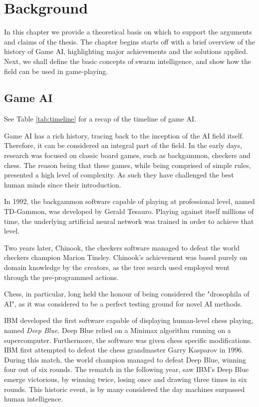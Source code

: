 \section{Background} \label{section:background}
In this chapter we provide a theoretical basis on which to support the arguments and claims of the thesis. 
The chapter begins starts off with a brief overview of the history of Game AI, 
highlighting major achievements and the solutions applied.
Next, we shall define the basic concepts of swarm intelligence, 
and show how the field can be used in game-playing.


\subsection{Game AI} \label{subsection:game_ai}
See Table \ref{tab:timeline} for a recap of the timeline of game AI.


Game AI has a rich history, tracing back to the inception of the AI field itself.
Therefore, it can be considered an integral part of the field.
In the early days, research was focused on classic board games, such as backgammon, checkers and chess.
The reason being that these games, 
while being comprised of simple rules, 
presented a high level of complexity.
As such they have challenged the best human minds since their introduction.

In 1992, the backgammon software capable of playing at professional level, named TD-Gammon, was developed by Gerald Tesauro.
Playing against itself millions of time, the underlying artificial neural network was trained in order to achieve that level.

Two years later, Chinook, the checkers software managed to defeat the world checkers champion Marion Tinsley.
Chinook's achievement was based purely on domain knowledge by the creators, 
as the tree search used employed went through the pre-programmed actions.

Chess, in particular, long held the honour of being considered the "drosophila of AI", 
as it was considered to be a perfect testing ground for novel AI methods.

IBM developed the first software capable of displaying human-level chess playing, named \textit{Deep Blue}.
Deep Blue relied on a Minimax algorithm running on a supercomputer.
Furthermore, the software was given chess specific modifications.
IBM first attempted to defeat the chess grandmaster Garry Kasparov in 1996.
During this match, the world champion managed to defeat Deep Blue, winning four out of six rounds.
The rematch in the following year, saw IBM's Deep Blue emerge victorious, 
by winning twice, losing once and drawing three times in six rounds.
This historic event, is by many considered the day machines surpassed human intelligence.


